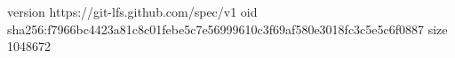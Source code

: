 version https://git-lfs.github.com/spec/v1
oid sha256:f7966bc4423a81c8c01febe5c7e56999610c3f69af580e3018fc3c5e5c6f0887
size 1048672
